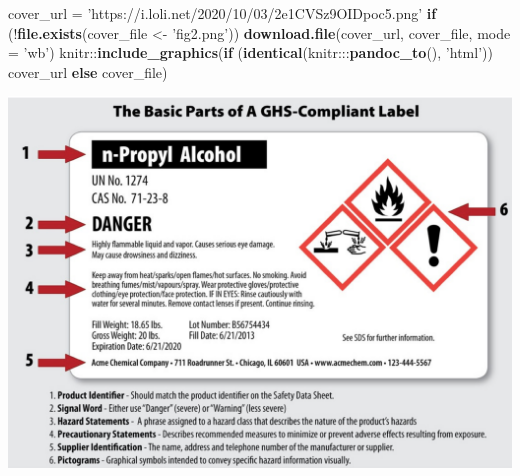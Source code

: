 \documentclass[]{tufte-book}
\newenvironment{Shaded}{}{}
\newcommand{\ControlFlowTok}[1]{\textcolor[rgb]{0.00,0.44,0.13}{\textbf{#1}}}
\newcommand{\DataTypeTok}[1]{\textcolor[rgb]{0.56,0.13,0.00}{#1}}
\newcommand{\KeywordTok}[1]{\textcolor[rgb]{0.00,0.44,0.13}{\textbf{#1}}}
\newcommand{\NormalTok}[1]{#1}
\newcommand{\OperatorTok}[1]{\textcolor[rgb]{0.40,0.40,0.40}{#1}}
\newcommand{\StringTok}[1]{\textcolor[rgb]{0.25,0.44,0.63}{#1}}
\begin{document}
\begin{Shaded}
\begin{Highlighting}[]
\NormalTok{cover_url =}\StringTok{ 'https://i.loli.net/2020/10/03/2e1CVSz9OIDpoc5.png'}
\ControlFlowTok{if}\NormalTok{ (}\OperatorTok{!}\KeywordTok{file.exists}\NormalTok{(cover_file <-}\StringTok{ 'fig2.png'}\NormalTok{))}
  \KeywordTok{download.file}\NormalTok{(cover_url, cover_file, }\DataTypeTok{mode =} \StringTok{'wb'}\NormalTok{)}
\NormalTok{knitr}\OperatorTok{::}\KeywordTok{include_graphics}\NormalTok{(}\ControlFlowTok{if}\NormalTok{ (}\KeywordTok{identical}\NormalTok{(knitr}\OperatorTok{:::}\KeywordTok{pandoc_to}\NormalTok{(), }\StringTok{'html'}\NormalTok{)) cover_url }\ControlFlowTok{else}\NormalTok{ cover_file)}
\end{Highlighting}
\end{Shaded}

\includegraphics[width=20.53in]{fig2}
\end{document}

